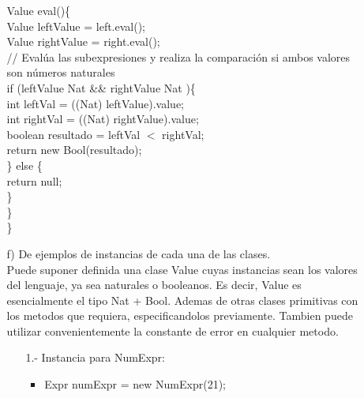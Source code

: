 \documentclass{article}
\begin{document}
\begin{itemize}
\begin{itemize}
            \hspace*{0.6cm}Value eval()\{\\
            \hspace*{1.37cm}Value leftValue = left.eval();\\
            \hspace*{1.37cm}Value rightValue = right.eval();\\
            \hspace*{1.37cm}// Evalúa las subexpresiones y realiza la comparación si ambos valores son números naturales\\
            \hspace*{1.37cm}if (leftValue Nat \&\& rightValue Nat )\{\\
            \hspace*{1.97cm}int leftVal = ((Nat) leftValue).value;\\
            \hspace*{1.97cm}int rightVal = ((Nat) rightValue).value;\\
            \hspace*{1.97cm}boolean resultado = leftVal $<$ rightVal;\\
            \hspace*{1.97cm}return new Bool(resultado);\\
            \hspace*{1.37cm}\} else \{\\
            \hspace*{1.97cm}return null;\\
            \hspace*{1.37cm}\}\\
            \hspace*{0.6cm}\}\\
            \}\\
            
            \item[f)] De ejemplos de instancias de cada una de las clases.\\
            
            Puede suponer definida una clase Value cuyas instancias sean los valores del lenguaje, ya sea naturales o booleanos. Es decir, Value es esencialmente el tipo Nat + Bool. Ademas de otras clases primitivas con los metodos que requiera, especificandolos previamente. Tambien puede utilizar convenientemente la constante de error en cualquier metodo.\\

            \begin{enumerate}
                \item[1.-] Instancia para NumExpr:\\
                \begin{itemize}
                    \item Expr numExpr = new NumExpr(21);\\
                \end{itemize}


\end{enumerate}
\end{itemize}
\end{itemize}
\end{document}
